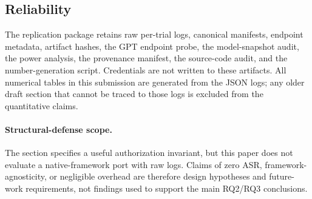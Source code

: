\subsection{Reliability}

The replication package retains raw per-trial logs, canonical manifests,
endpoint metadata, artifact hashes, the GPT endpoint probe, the model-snapshot
audit, the power analysis, the provenance manifest, the source-code audit, and
the number-generation script.  Credentials are not written to these
artifacts.  All numerical tables in this submission are generated from the
JSON logs; any older draft section that cannot be traced to those logs is
excluded from the quantitative claims.

\paragraph{Structural-defense scope.}
The \reauthgate{} section specifies a useful authorization invariant, but this
paper does not evaluate a native-framework port with raw logs.  Claims of zero
ASR, framework-agnosticity, or negligible overhead are therefore design
hypotheses and future-work requirements, not findings used to support the main
RQ2/RQ3 conclusions.
